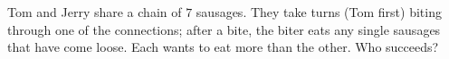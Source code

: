 Tom and Jerry share a chain of $7$ sausages. They take turns (Tom first) biting through one of the connections; after a bite, the biter eats any single sausages that have come loose. Each wants to eat more than the other. Who succeeds?
